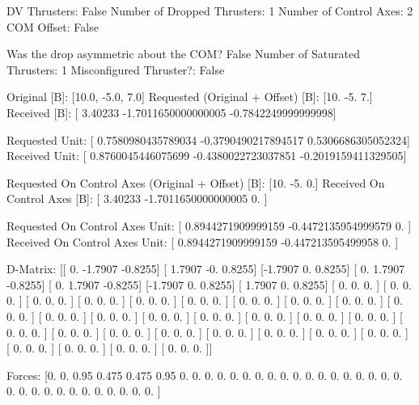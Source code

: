 DV Thrusters:	False
Number of Dropped Thrusters:	1
Number of Control Axes:	2
COM Offset:	False

Was the drop asymmetric about the COM?	False
Number of Saturated Thrusters:	1
Misconfigured Thruster?:	False

Original [B]:	[10.0, -5.0, 7.0]
Requested (Original + Offset) [B]:	[10. -5.  7.]
Received [B]:		[ 3.40233            -1.7011650000000005 -0.7842249999999998]

Requested Unit:		[ 0.7580980435789034 -0.3790490217894517  0.5306686305052324]
Received Unit:		[ 0.8760045446075699 -0.4380022723037851 -0.2019159411329505]

Requested On Control Axes (Original + Offset) [B]:	[10. -5.  0.]
Received On Control Axes [B]:		[ 3.40233            -1.7011650000000005  0.                ]

Requested On Control Axes Unit:		[ 0.8944271909999159 -0.4472135954999579  0.                ]
Received On Control Axes Unit:		[ 0.8944271909999159 -0.447213595499958   0.                ]

D-Matrix:
[[ 0.     -1.7907 -0.8255]
 [ 1.7907 -0.      0.8255]
 [-1.7907  0.      0.8255]
 [ 0.      1.7907 -0.8255]
 [ 0.      1.7907 -0.8255]
 [-1.7907  0.      0.8255]
 [ 1.7907  0.      0.8255]
 [ 0.      0.      0.    ]
 [ 0.      0.      0.    ]
 [ 0.      0.      0.    ]
 [ 0.      0.      0.    ]
 [ 0.      0.      0.    ]
 [ 0.      0.      0.    ]
 [ 0.      0.      0.    ]
 [ 0.      0.      0.    ]
 [ 0.      0.      0.    ]
 [ 0.      0.      0.    ]
 [ 0.      0.      0.    ]
 [ 0.      0.      0.    ]
 [ 0.      0.      0.    ]
 [ 0.      0.      0.    ]
 [ 0.      0.      0.    ]
 [ 0.      0.      0.    ]
 [ 0.      0.      0.    ]
 [ 0.      0.      0.    ]
 [ 0.      0.      0.    ]
 [ 0.      0.      0.    ]
 [ 0.      0.      0.    ]
 [ 0.      0.      0.    ]
 [ 0.      0.      0.    ]
 [ 0.      0.      0.    ]
 [ 0.      0.      0.    ]
 [ 0.      0.      0.    ]
 [ 0.      0.      0.    ]
 [ 0.      0.      0.    ]
 [ 0.      0.      0.    ]]

Forces:
[0.    0.    0.95  0.475 0.475 0.95  0.    0.    0.    0.    0.    0.
 0.    0.    0.    0.    0.    0.    0.    0.    0.    0.    0.    0.
 0.    0.    0.    0.    0.    0.    0.    0.    0.    0.    0.    0.   ]


